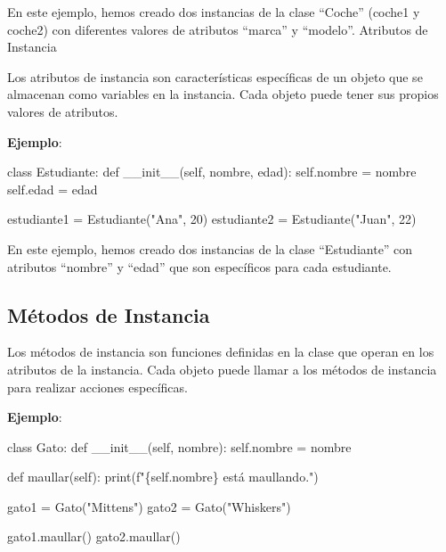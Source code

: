 \documentclass[
  a4paper,
  DIV=11,
  numbers=noendperiod,
  onepage,
  openany]{scrreprt}
\newenvironment{Shaded}{\begin{snugshade}}{\end{snugshade}}
\newcommand{\BuiltInTok}[1]{\textcolor[rgb]{0.00,0.23,0.31}{#1}}
\newcommand{\DecValTok}[1]{\textcolor[rgb]{0.68,0.00,0.00}{#1}}
\newcommand{\FunctionTok}[1]{\textcolor[rgb]{0.28,0.35,0.67}{#1}}
\newcommand{\KeywordTok}[1]{\textcolor[rgb]{0.00,0.23,0.31}{#1}}
\newcommand{\NormalTok}[1]{\textcolor[rgb]{0.00,0.23,0.31}{#1}}
\newcommand{\OperatorTok}[1]{\textcolor[rgb]{0.37,0.37,0.37}{#1}}
\newcommand{\SpecialCharTok}[1]{\textcolor[rgb]{0.37,0.37,0.37}{#1}}
\newcommand{\SpecialStringTok}[1]{\textcolor[rgb]{0.13,0.47,0.30}{#1}}
\newcommand{\StringTok}[1]{\textcolor[rgb]{0.13,0.47,0.30}{#1}}
\newcommand{\VariableTok}[1]{\textcolor[rgb]{0.07,0.07,0.07}{#1}}
\begin{document}
En este ejemplo, hemos creado dos instancias de la clase ``Coche''
(coche1 y coche2) con diferentes valores de atributos ``marca'' y
``modelo''. Atributos de Instancia

Los atributos de instancia son características específicas de un objeto
que se almacenan como variables en la instancia. Cada objeto puede tener
sus propios valores de atributos.

\textbf{Ejemplo}:

\begin{Shaded}
\begin{Highlighting}[]
\KeywordTok{class}\NormalTok{ Estudiante:}
    \KeywordTok{def} \FunctionTok{\_\_init\_\_}\NormalTok{(}\VariableTok{self}\NormalTok{, nombre, edad):}
        \VariableTok{self}\NormalTok{.nombre }\OperatorTok{=}\NormalTok{ nombre}
        \VariableTok{self}\NormalTok{.edad }\OperatorTok{=}\NormalTok{ edad}

\NormalTok{estudiante1 }\OperatorTok{=}\NormalTok{ Estudiante(}\StringTok{"Ana"}\NormalTok{, }\DecValTok{20}\NormalTok{)}
\NormalTok{estudiante2 }\OperatorTok{=}\NormalTok{ Estudiante(}\StringTok{"Juan"}\NormalTok{, }\DecValTok{22}\NormalTok{)}
\end{Highlighting}
\end{Shaded}

En este ejemplo, hemos creado dos instancias de la clase ``Estudiante''
con atributos ``nombre'' y ``edad'' que son específicos para cada
estudiante.

\subsection{Métodos de Instancia}\label{muxe9todos-de-instancia}

Los métodos de instancia son funciones definidas en la clase que operan
en los atributos de la instancia. Cada objeto puede llamar a los métodos
de instancia para realizar acciones específicas.

\textbf{Ejemplo}:

\begin{Shaded}
\begin{Highlighting}[]
\KeywordTok{class}\NormalTok{ Gato:}
    \KeywordTok{def} \FunctionTok{\_\_init\_\_}\NormalTok{(}\VariableTok{self}\NormalTok{, nombre):}
        \VariableTok{self}\NormalTok{.nombre }\OperatorTok{=}\NormalTok{ nombre}

    \KeywordTok{def}\NormalTok{ maullar(}\VariableTok{self}\NormalTok{):}
        \BuiltInTok{print}\NormalTok{(}\SpecialStringTok{f"}\SpecialCharTok{\{}\VariableTok{self}\SpecialCharTok{.}\NormalTok{nombre}\SpecialCharTok{\}}\SpecialStringTok{ está maullando."}\NormalTok{)}

\NormalTok{gato1 }\OperatorTok{=}\NormalTok{ Gato(}\StringTok{"Mittens"}\NormalTok{)}
\NormalTok{gato2 }\OperatorTok{=}\NormalTok{ Gato(}\StringTok{"Whiskers"}\NormalTok{)}

\NormalTok{gato1.maullar()}
\NormalTok{gato2.maullar()}
\end{Highlighting}
\end{Shaded}
\end{document}
